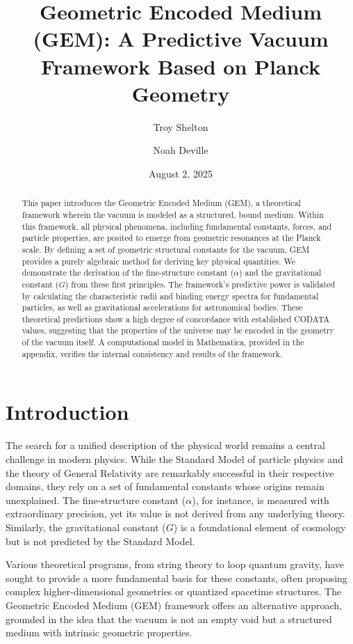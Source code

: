 \documentclass[12pt]{article}
\title{\textbf{Geometric Encoded Medium (GEM): A Predictive Vacuum Framework Based on Planck Geometry}}
\author[1]{Troy Shelton}
\author[1]{Noah Deville}
\affil[1]{Independent Researcher, Pine Prairie, LA}
\date{August 2, 2025}
\begin{document}
\maketitle

\begin{abstract}
This paper introduces the Geometric Encoded Medium (GEM), a theoretical framework wherein the vacuum is modeled as a structured, bound medium. Within this framework, all physical phenomena, including fundamental constants, forces, and particle properties, are posited to emerge from geometric resonances at the Planck scale. By defining a set of geometric structural constants for the vacuum, GEM provides a purely algebraic method for deriving key physical quantities. We demonstrate the derivation of the fine-structure constant ($\alpha$) and the gravitational constant ($G$) from these first principles. The framework's predictive power is validated by calculating the characteristic radii and binding energy spectra for fundamental particles, as well as gravitational accelerations for astronomical bodies. These theoretical predictions show a high degree of concordance with established CODATA values, suggesting that the properties of the universe may be encoded in the geometry of the vacuum itself. A computational model in Mathematica, provided in the appendix, verifies the internal consistency and results of the framework.
\end{abstract}

\section{Introduction}

The search for a unified description of the physical world remains a central challenge in modern physics. While the Standard Model of particle physics and the theory of General Relativity are remarkably successful in their respective domains, they rely on a set of fundamental constants whose origins remain unexplained. The fine-structure constant ($\alpha$), for instance, is measured with extraordinary precision, yet its value is not derived from any underlying theory. Similarly, the gravitational constant ($G$) is a foundational element of cosmology but is not predicted by the Standard Model.

Various theoretical programs, from string theory to loop quantum gravity, have sought to provide a more fundamental basis for these constants, often proposing complex higher-dimensional geometries or quantized spacetime structures. The Geometric Encoded Medium (GEM) framework offers an alternative approach, grounded in the idea that the vacuum is not an empty void but a structured medium with intrinsic geometric properties.
\end{document}
